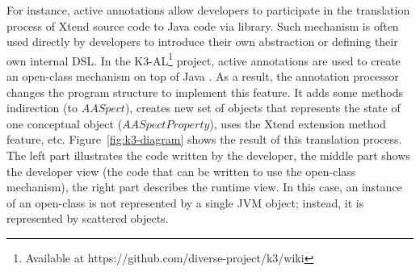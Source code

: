 For instance, active annotations allow developers to participate in the translation process of Xtend source code to Java code via library.
Such mechanism is often used directly by developers to introduce their own abstraction or defining their own internal DSL.
In the K3-AL\footnote{Available at https://github.com/diverse-project/k3/wiki} project, active annotations are used to create an open-class mechanism on top of Java \cite{Clifton:2000:MMO:353171.353181}. 
As a result, the annotation processor changes the program structure to implement this feature. 
It adds some methods indirection (to $AASpect$), creates new set of objects that represents the state of one conceptual object ($AASpectProperty$), uses the Xtend extension method feature, etc.
Figure~\ref{fig:k3-diagram} shows the result of this translation process. 
The left part illustrates the code written by the developer, the middle part shows the developer view (the code that can be written to use the open-class mechanism), the right part describes the runtime view.
In this case, an instance of an open-class is not represented by a single JVM object; instead, it is represented by scattered objects.  



